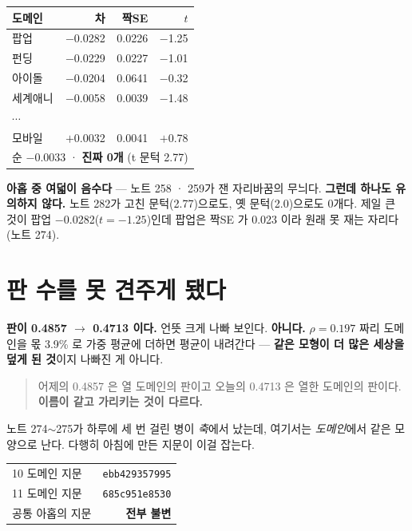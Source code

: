 \documentclass[10pt]{article}
\begin{document}
\begin{center}\small
\begin{tabular}{lrrr}
\hline
도메인 & 차 & 짝SE & $t$ \\
\hline
팝업 & $-$0.0282 & 0.0226 & $-$1.25 \\
펀딩 & $-$0.0229 & 0.0227 & $-$1.01 \\
아이돌 & $-$0.0204 & 0.0641 & $-$0.32 \\
세계애니 & $-$0.0058 & 0.0039 & $-$1.48 \\
$\cdots$ & & & \\
모바일 & $+$0.0032 & 0.0041 & $+$0.78 \\
\hline
\multicolumn{4}{l}{순 $-$0.0033 · \textbf{진짜 0개} (t 문턱 2.77)} \\
\hline
\end{tabular}
\end{center}

\textbf{아홉 중 여덟이 음수다} --- 노트 258 · 259가 잰 자리바꿈의 무늬다.
\textbf{그런데 하나도 유의하지 않다.} 노트 282가 고친 문턱(2.77)으로도, 옛
문턱(2.0)으로도 0개다. 제일 큰 것이 팝업 $-$0.0282($t{=}{-}1.25$)인데 팝업은
짝SE 가 0.023 이라 원래 못 재는 자리다(노트 274).

\section{판 수를 못 견주게 됐다}

\textbf{판이 0.4857 $\to$ 0.4713 이다.} 언뜻 크게 나빠 보인다. \textbf{아니다.}
$\rho{=}0.197$ 짜리 도메인을 몫 3.9\% 로 가중 평균에 더하면 평균이 내려간다 ---
\textbf{같은 모형이 더 많은 세상을 덮게 된 것}이지 나빠진 게 아니다.

\begin{quote}\small
어제의 0.4857 은 열 도메인의 판이고 오늘의 0.4713 은 열한 도메인의 판이다.
\textbf{이름이 같고 가리키는 것이 다르다.}
\end{quote}

노트 274$\sim$275가 하루에 세 번 걸린 병이 \emph{축}에서 났는데, 여기서는
\emph{도메인}에서 같은 모양으로 난다. 다행히 아침에 만든 지문이 이걸 잡는다.

\begin{center}\small
\begin{tabular}{lr}
\hline
10 도메인 지문 & \texttt{ebb429357995} \\
11 도메인 지문 & \texttt{685c951e8530} \\
공통 아홉의 지문 & \textbf{전부 불변} \\
\hline
\end{tabular}
\end{center}
\end{document}
